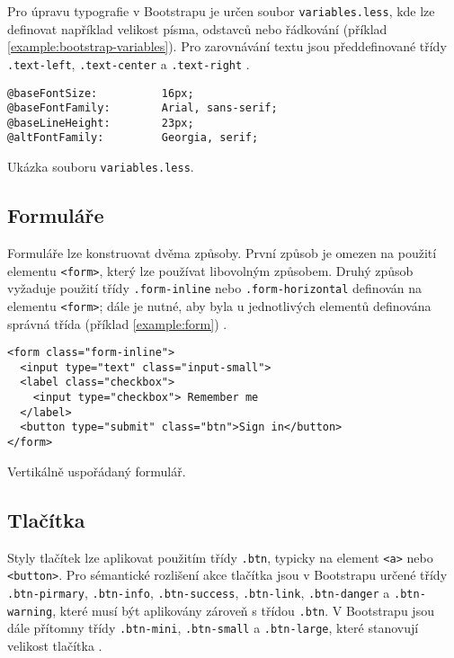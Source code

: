 Pro úpravu typografie v Bootstrapu je určen soubor \texttt{variables.less}, kde lze definovat například velikost písma, odstavců nebo řádkování (příklad \ref{example:bootstrap-variables}). Pro zarovnávání textu jsou předdefinované třídy \texttt{.text-left}, \texttt{.text-center} a \texttt{.text-right} \cite{19}.

\begin{example}
    \centering
    \begin{lstlisting}
@baseFontSize:          16px;
@baseFontFamily:        Arial, sans-serif;
@baseLineHeight:        23px;
@altFontFamily:         Georgia, serif;
    \end{lstlisting}
    \caption{Ukázka souboru \texttt{variables.less}.}
    \label{example:bootstrap-variables}
\end{example}

\subsection{Formuláře}

Formuláře lze konstruovat dvěma způsoby. První způsob je omezen na použití elementu \texttt{<form>}, který lze používat libovolným způsobem. Druhý způsob vyžaduje použití třídy \texttt{.form-inline} nebo \texttt{.form-horizontal} definován na elementu \texttt{<form>}; dále je nutné, aby byla u jednotlivých elementů definována správná třída (příklad \ref{example:form}) \cite{19}.

\begin{example}
    \centering
    \begin{lstlisting}
<form class="form-inline">
  <input type="text" class="input-small">
  <label class="checkbox">
    <input type="checkbox"> Remember me
  </label>
  <button type="submit" class="btn">Sign in</button>
</form>
    \end{lstlisting}
    \caption{Vertikálně uspořádaný formulář.}
    \label{example:form}
\end{example}

\subsection{Tlačítka}

Styly tlačítek lze aplikovat použitím třídy \texttt{.btn}, typicky na element \texttt{<a>} nebo \texttt{<button>}. Pro sémantické rozlišení akce tlačítka jsou v Bootstrapu určené třídy \texttt{.btn-pirmary}, \texttt{.btn-info}, \texttt{.btn-success}, \texttt{.btn-link}, \texttt{.btn-danger} a \texttt{.btn-warning}, které musí být aplikovány zároveň s třídou \texttt{.btn}. V Bootstrapu jsou dále přítomny třídy \texttt{.btn-mini}, \texttt{.btn-small} a \texttt{.btn-large}, které stanovují velikost tlačítka \cite{19}.

